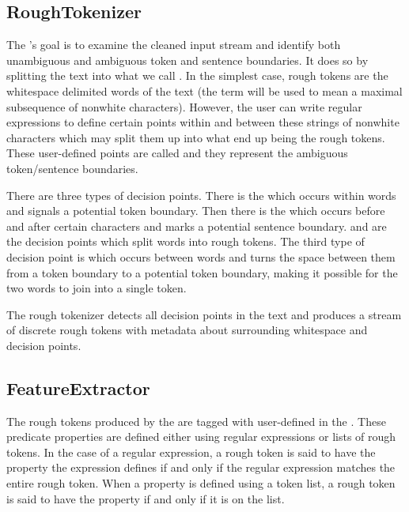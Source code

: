 \subsection{RoughTokenizer}
\label{ssec:impl-overview-roughtokenizer}

The 's goal is to examine the cleaned input stream and
identify both unambiguous and ambiguous token and sentence boundaries. It does
so by splitting the text into what we call . In the
simplest case, rough tokens are the whitespace delimited words of the text (the
term  will be used to mean a maximal subsequence of nonwhite
characters). However, the user can write regular expressions to define certain
points within and between these strings of nonwhite characters which may split
them up into what end up being the rough tokens. These user-defined points are
called  and they represent the ambiguous
token/sentence boundaries.

There are three types of decision points. There is the \maysplit{} which occurs
within words and signals a potential token boundary. Then there is the
\maybreaksentence{} which occurs before and after certain characters and marks
a potential sentence boundary. \maysplit{} and \maybreaksentence{} are the
decision points which split words into rough tokens. The third type of decision
point is \mayjoin{} which occurs between words and turns the space between them
from a token boundary to a potential token boundary, making it possible for the
two words to join into a single token.

The rough tokenizer detects all decision points in the text and produces a
stream of discrete rough tokens with metadata about surrounding whitespace and
decision points.

\subsection{FeatureExtractor}
\label{ssec:impl-overview-featureextractor}

The rough tokens produced by the  are tagged with
user-defined  in the . These
predicate properties are defined either using regular expressions or lists of
rough tokens. In the case of a regular expression, a rough token is said to
have the property the expression defines if and only if the regular expression
matches the entire rough token. When a property is defined using a token list,
a rough token is said to have the property if and only if it is on the list.

